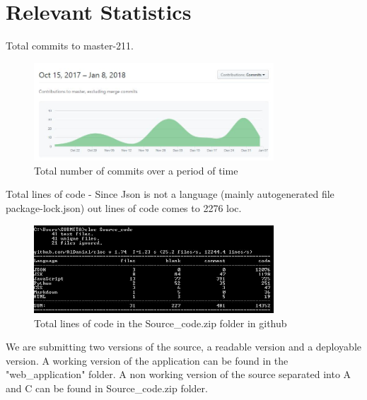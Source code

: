 \documentclass[a4paper,10pt]{article}
\begin{document}
\section{Relevant Statistics}
Total commits to master-211.
\begin{figure}[h]
\centering
\includegraphics[width=0.8\textwidth]{Capture1.JPG}
\caption{\label{}Total number of commits over a period of time}
\end{figure}
\newline
Total lines of code - Since Json is not a language (mainly autogenerated file package-lock.json) out lines of code comes to 2276 loc.
\newline
\begin{figure}[h]
\centering
\includegraphics[width=0.8\textwidth]{Capture.JPG}
\caption{\label{}Total lines of code in the Source{\_}code.zip folder in github }
\end{figure}
\newline
We are submitting two versions of the source, a readable version and a deployable version.  A working version of the application can be found in the "web{\_}application" folder.  A non working version of the source separated into A and C can be found in Source{\_}code.zip folder.




\newpage
\end{document}
